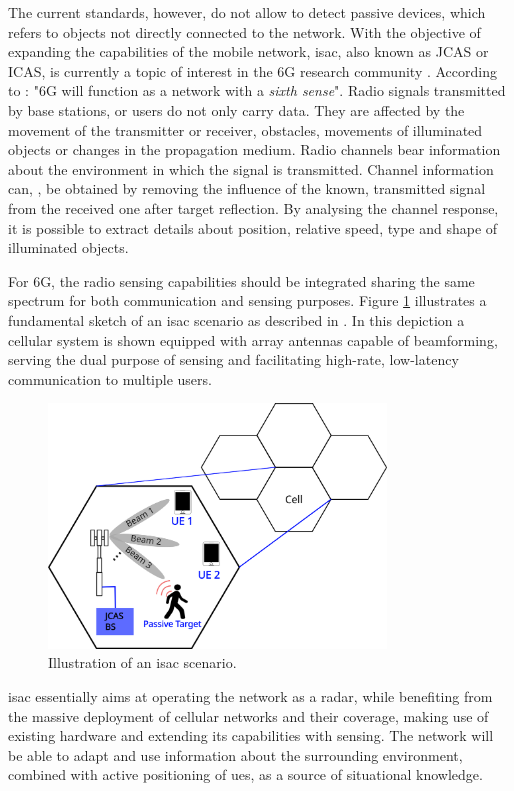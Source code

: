 The current standards, however, do not allow to detect passive devices, which refers to objects not directly connected to the network.
With the objective of expanding the capabilities of the mobile network, \gls{isac}, also known as JCAS or ICAS, is currently a topic of interest in the 6G research community \cite{Mandelli_Henninger_Bauhofer_Wild_2023}.
According to \cite{Viswanathan_Wild_2021}: "6G will function as a network with a \textit{sixth sense}". Radio signals transmitted by base stations, or users do not only carry data. They are affected by the movement of the transmitter or receiver, obstacles, movements of illuminated objects or changes in the propagation medium. Radio channels bear information about the environment in which the signal is transmitted. 
Channel information can, \eg, be obtained by removing the influence of the known, transmitted signal from the received one after target reflection. By analysing the channel response, it is possible to extract details about position, relative speed, type and shape of illuminated objects.

For 6G, the radio sensing capabilities should be integrated sharing the same spectrum for both communication and sensing purposes. Figure \ref{fig:isac-scheme-1} illustrates a fundamental sketch of an \gls{isac} scenario as described in \cite{Wild_Grudnitsky_Mandelli_Henninger_Guan_Schaich_2023}. In this depiction a cellular system is shown equipped with array antennas capable of beamforming, serving the dual purpose of sensing and facilitating high-rate, low-latency communication to multiple users.
\begin{figure}[H]
	\centering
	\includegraphics[width=0.8\textwidth]{Images/introduction/isac-scheme-1.png}
	\caption{Illustration of an \gls{isac} scenario.}
	\label{fig:isac-scheme-1}
\end{figure}
\Gls{isac} essentially aims at operating the network as a radar, while benefiting from the massive deployment of cellular networks and their coverage, making use of existing hardware and extending its capabilities with sensing.
The network will be able to adapt and use information about the surrounding environment, combined with active positioning of \glspl{ue}, as a source of situational knowledge.



